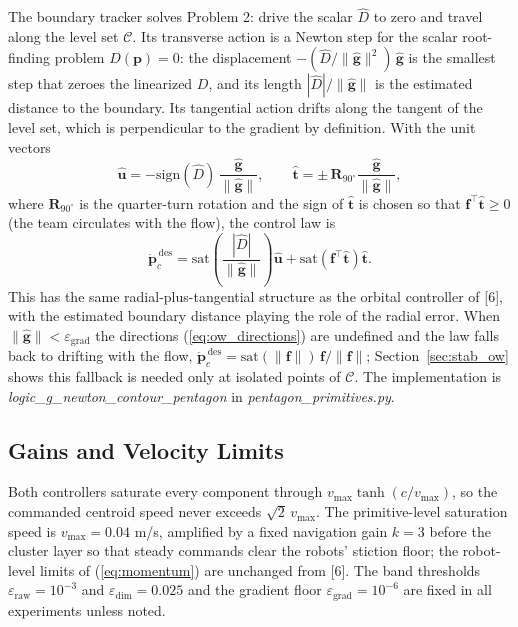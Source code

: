 \documentclass[lettersize,journal]{IEEEtran}
\begin{document}
The boundary tracker solves Problem 2: drive the scalar $\hat{D}$ to
zero and travel along the level set $\mathcal{C}$. Its transverse
action is a Newton step for the scalar root-finding problem
$D(\mathbf{p}) = 0$: the displacement
$-(\hat{D}/\|\hat{\mathbf{g}}\|^2)\,\hat{\mathbf{g}}$ is the smallest
step that zeroes the linearized $D$, and its length
$|\hat{D}|/\|\hat{\mathbf{g}}\|$ is the estimated distance to the
boundary. Its tangential action drifts along the tangent of the level
set, which is perpendicular to the gradient by definition. With the
unit vectors
\begin{equation}
    \hat{\mathbf{u}} = -\mathrm{sign}(\hat{D})\,
    \frac{\hat{\mathbf{g}}}{\|\hat{\mathbf{g}}\|},
    \qquad
    \hat{\mathbf{t}} = \pm\,\mathbf{R}_{90^\circ}
    \frac{\hat{\mathbf{g}}}{\|\hat{\mathbf{g}}\|},
    \label{eq:ow_directions}
\end{equation}
where $\mathbf{R}_{90^\circ}$ is the quarter-turn rotation and the sign
of $\hat{\mathbf{t}}$ is chosen so that $\mathbf{f}^\top
\hat{\mathbf{t}} \geq 0$ (the team circulates with the flow), the
control law is
\begin{equation}
    \dot{\mathbf{p}}_c^{\,\text{des}} =
    \mathrm{sat}\!\left(\frac{|\hat{D}|}{\|\hat{\mathbf{g}}\|}\right)
    \hat{\mathbf{u}}
    + \mathrm{sat}\!\left(\mathbf{f}^\top \hat{\mathbf{t}}\right)
    \hat{\mathbf{t}}.
    \label{eq:ow_law}
\end{equation}
This has the same radial-plus-tangential structure as the orbital
controller of [6], with the estimated boundary distance playing the
role of the radial error. When $\|\hat{\mathbf{g}}\| <
\varepsilon_{\text{grad}}$ the directions (\ref{eq:ow_directions}) are
undefined and the law falls back to drifting with the flow,
$\dot{\mathbf{p}}_c^{\,\text{des}} = \mathrm{sat}(\|\mathbf{f}\|)\,
\mathbf{f}/\|\mathbf{f}\|$; Section~\ref{sec:stab_ow} shows this
fallback is needed only at isolated points of $\mathcal{C}$. The
implementation is \textit{logic\_g\_newton\_contour\_pentagon} in
\textit{pentagon\_primitives.py}.

\subsection{Gains and Velocity Limits}

Both controllers saturate every component through $v_{\max}\tanh(c /
v_{\max})$, so the commanded centroid speed never exceeds
$\sqrt{2}\,v_{\max}$. The primitive-level saturation speed is $v_{\max}
= 0.04$ m/s, amplified by a fixed navigation gain $k = 3$ before the
cluster layer so that steady commands clear the robots' stiction floor;
the robot-level limits of (\ref{eq:momentum}) are unchanged from [6].
The band thresholds $\varepsilon_{\text{raw}} = 10^{-3}$ and
$\varepsilon_{\text{dim}} = 0.025$ and the gradient floor
$\varepsilon_{\text{grad}} = 10^{-6}$ are fixed in all experiments
unless noted.
\end{document}
